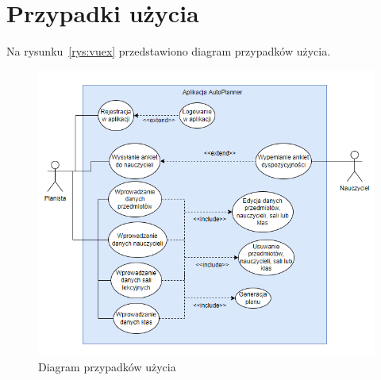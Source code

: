 \section{Przypadki użycia}
Na rysunku~\ref{rys:vuex} przedstawiono diagram przypadków użycia.
\begin{figure}[!ht]
\centering\includegraphics[width=\textwidth]{figures/DiagramPU}
\caption{Diagram przypadków użycia}\label{rys:pu}
\end{figure}


